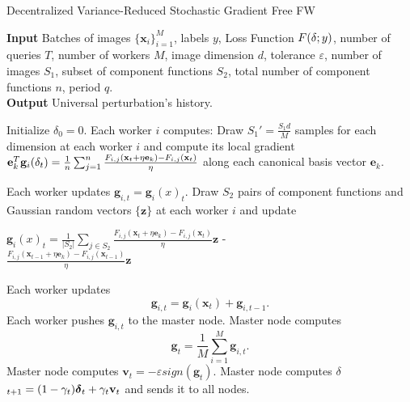 \begin{algorithm}
	\caption{Decentralized Variance-Reduced Stochastic Gradient Free FW}\label{variance-reduced}
	\textbf{Input} Batches of images $\{\mathbf{x}_i\}_{i=1}^M$, labels $y$, Loss Function $F(\text{\boldmath}\delta;y)$, number of queries $T$, number of workers $M$, image dimension $d$, tolerance $\varepsilon$, number of images $S_1$, subset of component functions $S_2$, total number of component functions $n$, period $q$.\\
	\textbf{Output} Universal perturbation's history.
	\begin{algorithmic}[1]		
		\State Initialize \boldmath$\delta_0 = \text{0}$.
		\State Each worker $i$ computes:
		\State Draw {\small$S_1' = \frac{S_1d}{M}$} samples for each dimension at each worker $i$ and compute its local gradient \newline
		{\small$ \mathbf{e}_k^T\mathbf{g}_i(\text{\boldmath} \delta_t) = \frac{1}{n}\sum_{j=1}^{n}\frac{F_{i,j}(\mathbf{x}_t + \eta\mathbf{e}_k) - F_{i,j}(\mathbf{x}_t) }{\eta} $} along each canonical basis vector $\mathbf{e}_k$.
		
		\State Each worker updates $\mathbf{g}_{i,t} = \mathbf{g}_i(x)_t$.
		\Else
		\State Draw $S_2$ pairs of component functions and Gaussian random vectors $\{\mathbf{z}\}$ at each worker $i$ and update
		
		\parbox[b]{\linewidth}{$\mathbf{g}_i(x)_t = \frac{1}{|S_2|} \sum_{j \in S_2}\frac{F_{i,j}(\mathbf{x}_t + \eta\mathbf{e}_k)- F_{i,j}(\mathbf{x}_t) }{\eta} \mathbf{z}$ -\\
			
			$\frac{F_{i,j}(\mathbf{x}_{t-1} + \eta\mathbf{e}_k) - F_{i,j}(\mathbf{x}_{t-1}) }{\eta} \mathbf{z}$}
				
		\State Each worker updates 
		\begin{equation*}
			\mathbf{g}_{i,t} = \mathbf{g}_i(\mathbf{x}_t) +  \mathbf{g}_{i,t-1}.
		\end{equation*}
		\EndIf
		\State Each worker pushes $\mathbf{g}_{i,t}$ to the master node.
		\State Master node computes 
		\[\mathbf{g}_t = \frac{1}{M} \sum_{i=1}^{M} \mathbf{g}_{i,t}.\]
		\State Master node computes $\mathbf{v}_t = - \varepsilon sign(\mathbf{g}_t)$.
		\State Master node computes \mbox{\boldmath$ \delta$}$_{t+1} = (1-\gamma_t)\mbox{\boldmath$ \delta$}_t + \gamma_t\mathbf{v}_t$ and sends it to all nodes.
		\EndFor
	\end{algorithmic}
\end{algorithm}
